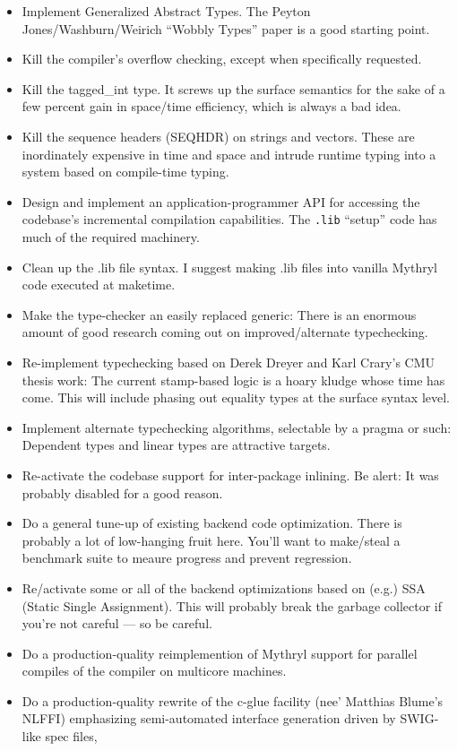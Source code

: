 \begin{itemize}
\item Implement Generalized Abstract Types.  The Peyton Jones/Washburn/Weirich ``Wobbly Types'' paper is a good starting point.
\item Kill the compiler's overflow checking, except when specifically requested.
\item Kill the tagged\_int type.  It screws up the surface semantics for the sake of a few percent gain in space/time efficiency, which is always a bad idea.
\item Kill the sequence headers (SEQHDR) on strings and vectors.  These are inordinately expensive in time and space and intrude runtime typing into a system based on compile-time typing.
\item Design and implement an application-programmer API for accessing the codebase's incremental compilation capabilities.  The {\tt .lib} ``setup'' code has much of the required machinery.
\item Clean up the .lib file syntax.  I suggest making .lib files into vanilla Mythryl code executed at maketime.
\item Make the type-checker an easily replaced generic: There is an enormous amount of good research coming out on improved/alternate typechecking.
\item Re-implement typechecking based on Derek Dreyer and Karl Crary's CMU thesis work: The current stamp-based logic is a hoary kludge whose time has come. This will include phasing out equality types at the surface syntax level.
\item Implement alternate typechecking algorithms, selectable by a pragma or such:  Dependent types and linear types are attractive targets.
\item Re-activate the codebase support for inter-package inlining.  Be alert: It was probably disabled for a good reason.
\item Do a general tune-up of existing backend code optimization. There is probably a lot of low-hanging fruit here. You'll want to make/steal a benchmark suite to meaure progress and prevent regression.
\item Re/activate some or all of the backend optimizations based on (e.g.) SSA (Static Single Assignment).  This will probably break the garbage collector if you're not careful --- so be careful.
\item Do a production-quality reimplemention of Mythryl support for parallel compiles of the compiler on multicore machines.
\item Do a production-quality rewrite of the c-glue facility (nee' Matthias Blume's NLFFI) emphasizing semi-automated interface generation driven by SWIG-like spec files, 

\end{itemize}
